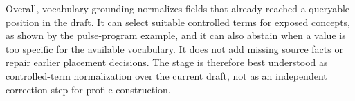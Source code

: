 Overall, vocabulary grounding normalizes fields that already reached a queryable position in the draft.
It can select suitable controlled terms for exposed concepts, as shown by the pulse-program example, and it can also abstain when a value is too specific for the available vocabulary.
It does not add missing source facts or repair earlier placement decisions.
The stage is therefore best understood as controlled-term normalization over the current draft, not as an independent correction step for profile construction.
\FloatBarrier
